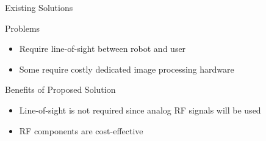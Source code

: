 \documentclass{beamer}
\begin{document}





\begin{frame}{Existing Solutions}
  \begin{block}{Problems}
    \begin{itemize}
      \item Require line-of-sight between robot and user
      \item Some require costly dedicated image processing hardware
    \end{itemize}
  \end{block}
  \pause
  \begin{block}{Benefits of Proposed Solution}
    \begin{itemize}
      \item Line-of-sight is not required since analog RF signals will be used
      \item RF components are cost-effective
    \end{itemize}
  \end{block}
\end{frame}
\end{document}

